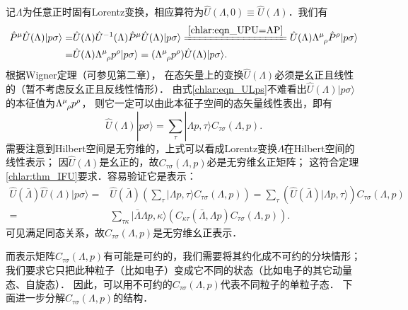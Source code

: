 记$\Lambda$为任意正时固有Lorentz变换，相应算符为$\hat{U}(\Lambda,0)\equiv \hat{U}(\Lambda)$．我们有
\begin{align}
	\hat{P}^\mu \hat{U}(\Lambda) |p\sigma\rangle =&
	\hat{U}(\Lambda)\hat{U}^{-1}(\Lambda)\hat{P}^\mu \hat{U}(\Lambda) |p\sigma\rangle 
	\xlongequal{\ref{chlar:eqn_UPU=AP}}
	\hat{U}(\Lambda) \Lambda_{\hphantom{\nu}\rho}^{\mu}  \hat{P}^{\rho} |p\sigma\rangle \notag \\
	=& \hat{U}(\Lambda) \Lambda_{\hphantom{\nu}\rho}^{\mu}  p^{\rho} |p\sigma\rangle 
	= (\Lambda_{\hphantom{\nu}\rho}^{\mu}  p^{\rho}) \hat{U}(\Lambda) |p\sigma\rangle .	\label{chlar:eqn_ULps}
\end{align}
根据Wigner定理（可参见\parencite{weinberg_vol1}第二章），
在态矢量上的变换$\hat{U}(\Lambda)$必须是幺正且线性的（暂不考虑反幺正且反线性情形）．
由式\eqref{chlar:eqn_ULps}不难看出$\hat{U}(\Lambda) |p\sigma\rangle$的本征值为$\Lambda_{\hphantom{\nu}\rho}^{\mu}  p^{\rho}$，
则它一定可以由此本征子空间的态矢量线性表出，即有
\begin{equation}\label{chlar:eqn_UpC}
	\hat{U}(\Lambda) |p\sigma\rangle = \sum_{\tau} |\Lambda p,\tau \rangle C_{\tau\sigma}(\Lambda,p).
\end{equation}
需要注意到Hilbert空间是无穷维的，上式可以看成Lorentz变换$\Lambda$在Hilbert空间的线性表示；
因$\hat{U}(\Lambda)$是幺正的，故$C_{\tau\sigma}(\Lambda,p)$必是无穷维幺正矩阵；
这符合定理\ref{chlar:thm_IFU}要求．容易验证它是表示：
\begin{align*}
	\hat{U}(\bar{\Lambda}) \hat{U}(\Lambda) |p\sigma\rangle = &
	\hat{U}(\bar{\Lambda})\left(\sum_{\tau} |\Lambda p,\tau \rangle C_{\tau\sigma}(\Lambda,p) \right)
	=\sum_{\tau} \left( \hat{U}(\bar{\Lambda})|\Lambda p,\tau \rangle \right) C_{\tau\sigma}(\Lambda,p) \\
	=&\sum_{\tau\kappa}  |\bar{\Lambda}\Lambda p,\kappa \rangle 
	\left(C_{\kappa\tau}(\bar{\Lambda},\Lambda p)  C_{\tau\sigma}(\Lambda,p) \right).
\end{align*}
可见满足同态关系，故$C_{\tau\sigma}(\Lambda,p)$是无穷维幺正表示．


而表示矩阵$C_{\tau\sigma}(\Lambda,p)$有可能是可约的，我们需要将其约化成不可约的分块情形；
我们要求它只把此种粒子（比如电子）变成它不同的状态（比如电子的其它动量态、自旋态）．
因此，可以用不可约的$C_{\tau\sigma}(\Lambda,p)$代表不同粒子的单粒子态．
下面进一步分解$C_{\tau\sigma}(\Lambda,p)$的结构．




